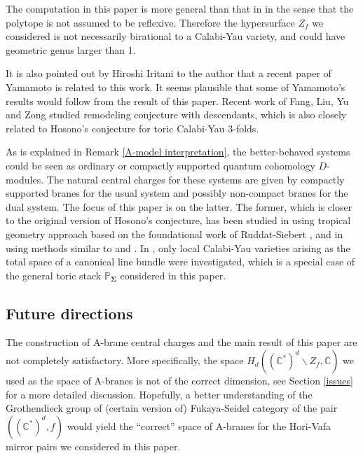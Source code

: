 \documentclass[11pt,reqno]{amsart}
\def\CC {{\mathbb C}}
\def\PP {{\mathbb P}}
\theoremstyle{definition}
\numberwithin{equation}{section}
\begin{document}
\smallskip

The computation in this paper is more general than that in \cite{I-2} in the sense that the polytope is not assumed to be reflexive. Therefore the hypersurface $Z_f$ we considered is not necessarily birational to a Calabi-Yau variety, and could have geometric genus larger than 1.

\smallskip

It is also pointed out by Hiroshi Iritani to the author that a recent paper of Yamamoto \cite{Yamamoto} is related to this work. It seems plausible that some of Yamamoto's results would follow from the result of this paper. Recent work \cite{FLYZ} of Fang, Liu, Yu and Zong studied remodeling conjecture with descendants, which is also closely related to Hosono's conjecture for toric Calabi-Yau 3-folds.

\smallskip

As is explained in Remark \ref{A-model interpretation}, the better-behaved systems could be seen as ordinary or compactly supported quantum cohomology $D$-modules. The natural central charges for these systems are given by compactly supported branes for the usual system and possibly non-compact branes for the dual system. The focus of this paper is on the latter. The former, which is closer to the original version of Hosono's conjecture, has been studied in \cite{Wang} using tropical geometry approach based on the foundational work of Ruddat-Siebert \cite{RS}, and in \cite{I-3} using methods similar to \cite{I-1} and \cite{I-2}. In \cite{I-3}, only local Calabi-Yau varieties arising as the total space of a canonical line bundle were investigated, which is a special case of the general toric stack $\PP_{\mathbf{\Sigma}}$ considered in this paper.



\subsection{Future directions}

The construction of A-brane central charges and the main result of this paper are not completely satisfactory. More specifically, the space $H_d((\CC^*)^d\backslash Z_f,\CC)$ we used as the space of A-branes is not of the correct dimension, see Section \ref{issues} for a more detailed discussion. Hopefully, a better understanding of the Grothendieck group of (certain version of) Fukaya-Seidel category of the pair $((\CC^*)^d, f)$ would yield the ``correct'' space of A-branes for the Hori-Vafa mirror pairs we considered in this paper.
\end{document}
